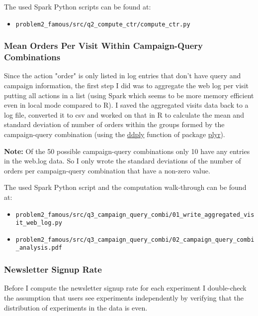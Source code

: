 \documentclass{article}\usepackage[]{graphicx}\usepackage[]{color}
\begin{document}
\bigskip
The used Spark Python scripts can be found at:
\begin{itemize}
	\item \verb+problem2_famous/src/q2_compute_ctr/compute_ctr.py+
\end{itemize}



\subsubsection{Mean Orders Per Visit Within Campaign-Query Combinations} %
\label{subsub:mean_cq}
Since the action "order" is only listed in log entries that don't have query and campaign information, the first step I did was to aggregate the web log per visit putting all actions in a list (using Spark which seems to be more memory efficient even in local mode compared to R).
I saved the aggregated visits data back to a log file, converted it to csv and worked on that in R to calculate the mean and standard deviation of number of orders within the groups formed by the campaign-query combination (using the \href{http://www.inside-r.org/packages/cran/plyr/docs/ddply}{ddply} function of package \href{http://cran.r-project.org/web/packages/plyr/index.html}{plyr}).

\textbf{Note:} Of the 50 possible campaign-query combinations only 10 have any entries in the web.log data. So I only wrote the standard deviations of the number of orders per campaign-query combination that have a non-zero value. 

\bigskip
The used Spark Python script and the computation walk-through can be found at:
\begin{itemize}
	\item \verb+problem2_famous/src/q3_campaign_query_combi/01_write_aggregated_visit_web_log.py+
	\item \verb+problem2_famous/src/q3_campaign_query_combi/02_campaign_query_combi_analysis.pdf+
\end{itemize}


\subsubsection{Newsletter Signup Rate} %
\label{subsub:signup}

Before I compute the newsletter signup rate for each experiment I double-check the assumption that users see experiments independently by verifying that the distribution of experiments in the data is even.
\end{document}
